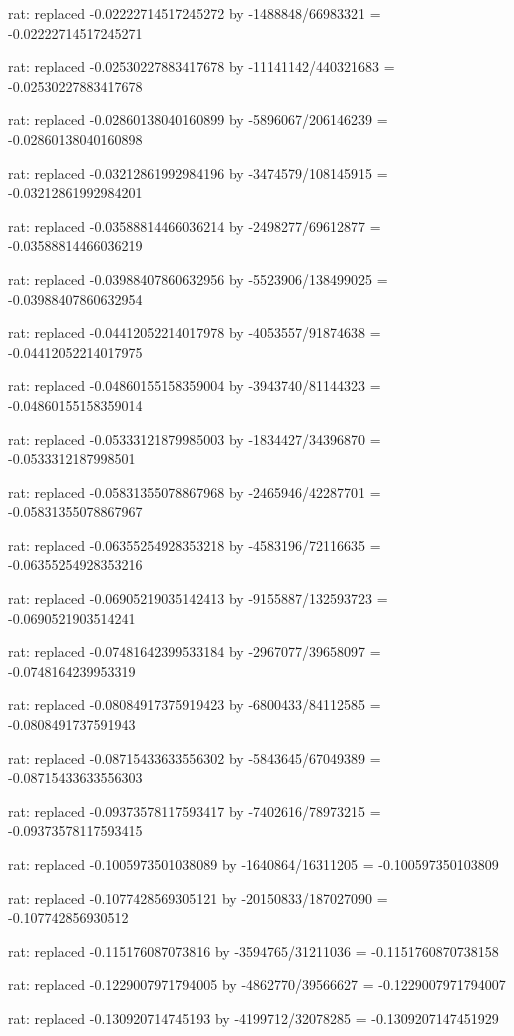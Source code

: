 \documentclass[a4paper,10pt]{article}
\begin{document}
\begin{eulernotebook}
\begin{eulercomment}
\begin{eulercomment}
\begin{eulercomment}
\begin{eulercomment}
\begin{eulercomment}
\begin{eulercomment}
\begin{eulercomment}
\begin{eulercomment}
\begin{eulercomment}
\begin{eulercomment}
\begin{eulercomment}
\begin{eulercomment}
\begin{eulercomment}
\begin{eulercomment}
\begin{eulercomment}
\begin{eulercomment}
\begin{euleroutput}
  rat: replaced -0.02222714517245272 by -1488848/66983321 = -0.02222714517245271
  
  rat: replaced -0.02530227883417678 by -11141142/440321683 = -0.02530227883417678
  
  rat: replaced -0.02860138040160899 by -5896067/206146239 = -0.02860138040160898
  
  rat: replaced -0.03212861992984196 by -3474579/108145915 = -0.03212861992984201
  
  rat: replaced -0.03588814466036214 by -2498277/69612877 = -0.03588814466036219
  
  rat: replaced -0.03988407860632956 by -5523906/138499025 = -0.03988407860632954
  
  rat: replaced -0.04412052214017978 by -4053557/91874638 = -0.04412052214017975
  
  rat: replaced -0.04860155158359004 by -3943740/81144323 = -0.04860155158359014
  
  rat: replaced -0.05333121879985003 by -1834427/34396870 = -0.0533312187998501
  
  rat: replaced -0.05831355078867968 by -2465946/42287701 = -0.05831355078867967
  
  rat: replaced -0.06355254928353218 by -4583196/72116635 = -0.06355254928353216
  
  rat: replaced -0.06905219035142413 by -9155887/132593723 = -0.0690521903514241
  
  rat: replaced -0.07481642399533184 by -2967077/39658097 = -0.0748164239953319
  
  rat: replaced -0.08084917375919423 by -6800433/84112585 = -0.0808491737591943
  
  rat: replaced -0.08715433633556302 by -5843645/67049389 = -0.08715433633556303
  
  rat: replaced -0.09373578117593417 by -7402616/78973215 = -0.09373578117593415
  
  rat: replaced -0.1005973501038089 by -1640864/16311205 = -0.100597350103809
  
  rat: replaced -0.1077428569305121 by -20150833/187027090 = -0.107742856930512
  
  rat: replaced -0.115176087073816 by -3594765/31211036 = -0.1151760870738158
  
  rat: replaced -0.1229007971794005 by -4862770/39566627 = -0.1229007971794007
  
  rat: replaced -0.130920714745193 by -4199712/32078285 = -0.1309207147451929
  

\end{euleroutput}
\end{eulercomment}
\end{eulercomment}
\end{eulercomment}
\end{eulercomment}
\end{eulercomment}
\end{eulercomment}
\end{eulercomment}
\end{eulercomment}
\end{eulercomment}
\end{eulercomment}
\end{eulercomment}
\end{eulercomment}
\end{eulercomment}
\end{eulercomment}
\end{eulercomment}
\end{eulercomment}
\end{eulernotebook}
\end{document}
